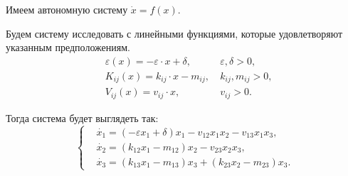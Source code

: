     Имеем автономную систему \( \dot{x} = f(x) \).

    Будем систему исследовать с линейными функциями, которые удовлетворяют указанным предположениям.
    \[
        \begin{split}
            & \varepsilon(x) = -\varepsilon \cdot x + \delta, & ~ \varepsilon, \delta > 0, \\
            & K_{ij} (x) = k_{ij} \cdot x - m_{ij}, & ~ k_{ij}, m_{ij} > 0, \\
            & V_{ij} (x) = v_{ij} \cdot x, & ~ v_{ij} > 0. 
        \end{split}
    \]

    Тогда система будет выглядеть так:
    \[
        \left\{\begin{split}
            & \dot{x_1} = \left( -\varepsilon x_1 + \delta \right)x_1 - v_{12} x_1 x_2 - v_{13} x_1 x_3, \\
            & \dot{x_2} = \left( k_{12} x_1 - m_{12} \right)x_2 - v_{23} x_2 x_3, \\
            & \dot{x_3} = \left( k_{13} x_1 - m_{13} \right)x_3 + \left( k_{23} x_2 - m_{23} \right)x_3. 
        \end{split}\right.
    \]